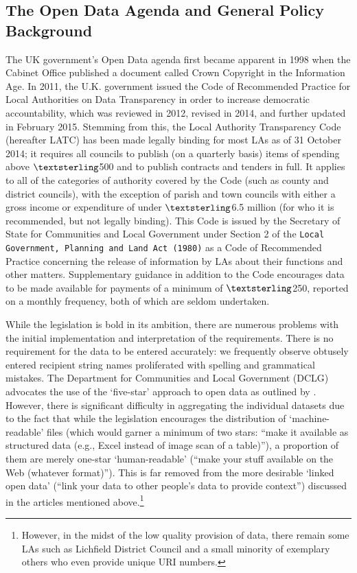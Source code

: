 \documentclass[12pt]{article}
\begin{document}
\subsection{The Open Data Agenda and General Policy Background}

The UK government's Open Data agenda first became apparent in 1998 when the Cabinet Office published a document called Crown Copyright in the Information Age. In 2011, the U.K. government issued the Code of Recommended Practice for Local Authorities on Data Transparency in order to increase democratic accountability, which was reviewed in 2012, revised in 2014, and further updated in February 2015. Stemming from this, the Local Authority Transparency Code (hereafter LATC) has been made legally binding for most LAs as of 31 October 2014; it requires all councils to publish (on a quarterly basis) items of spending above $\textsterling$500 and to publish contracts and tenders in full. It applies to all of the categories of authority covered by the Code (such as county and district councils), with the exception of parish and town councils with either a gross income or expenditure of under $\textsterling$6.5 million (for who it is recommended, but not legally binding). This Code is issued by the Secretary of State for Communities and Local Government under Section 2 of the \texttt{Local Government, Planning and Land Act (1980)} as a Code of Recommended Practice concerning the release of information by LAs about their functions and other matters. Supplementary guidance in addition to the Code encourages data to be made available for payments of a minimum of $\textsterling$250, reported on a monthly frequency, both of which are seldom undertaken.

While the legislation is bold in its ambition, there are numerous problems with the initial implementation and interpretation of the requirements. There is no requirement for the data to be entered accurately: we frequently observe obtusely entered recipient string names proliferated with spelling and grammatical mistakes.  The Department for Communities and Local Government (DCLG) advocates the use of the `five-star' approach to open data as outlined by \cite{sirtim}. However, there is significant difficulty in aggregating the individual datasets due to the fact that while the legislation encourages the distribution of `machine-readable' files (which would garner a minimum of two stars: ``make it available as structured data (e.g., Excel instead of image scan of a table)''), a proportion of them are merely one-star `human-readable' (``make your stuff available on the Web (whatever format)''). This is far removed from the more desirable `linked open data' (``link your data to other people's data to provide context'')  discussed in the articles mentioned above.\footnote{However, in the midst of the low quality provision of data, there remain some LAs such as Lichfield District Council and a small minority of exemplary others who even provide unique URI numbers.}
\end{document}
